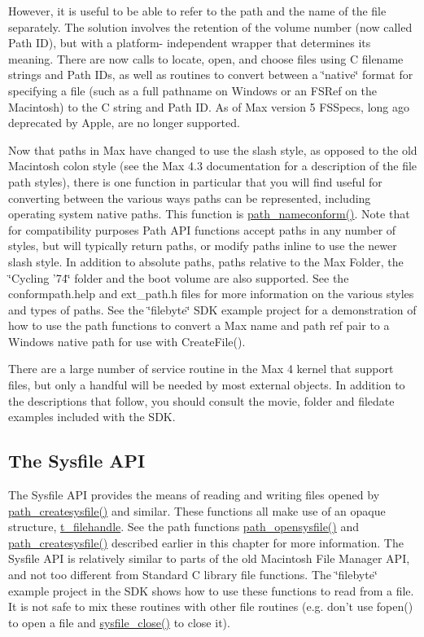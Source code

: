 However, it is useful to be able to refer to the path and the name of the file separately. The solution involves the retention of the volume number (now called Path ID), but with a platform-\/ independent wrapper that determines its meaning. There are now calls to locate, open, and choose files using C filename strings and Path IDs, as well as routines to convert between a \char`\"{}native\char`\"{} format for specifying a file (such as a full pathname on Windows or an FSRef on the Macintosh) to the C string and Path ID. As of Max version 5 FSSpecs, long ago deprecated by Apple, are no longer supported.

Now that paths in Max have changed to use the slash style, as opposed to the old Macintosh colon style (see the Max 4.3 documentation for a description of the file path styles), there is one function in particular that you will find useful for converting between the various ways paths can be represented, including operating system native paths. This function is \hyperlink{group__files_gaaf014af82bc666cd974b83441eb4c9c6}{path\_\-nameconform()}. Note that for compatibility purposes Path API functions accept paths in any number of styles, but will typically return paths, or modify paths inline to use the newer slash style. In addition to absolute paths, paths relative to the Max Folder, the \char`\"{}Cycling '74\char`\"{} folder and the boot volume are also supported. See the conformpath.help and ext\_\-path.h files for more information on the various styles and types of paths. See the \char`\"{}filebyte\char`\"{} SDK example project for a demonstration of how to use the path functions to convert a Max name and path ref pair to a Windows native path for use with CreateFile().

There are a large number of service routine in the Max 4 kernel that support files, but only a handful will be needed by most external objects. In addition to the descriptions that follow, you should consult the movie, folder and filedate examples included with the SDK.\hypertarget{group__files_sysfile_api}{}\subsection{The Sysfile API}\label{group__files_sysfile_api}
The Sysfile API provides the means of reading and writing files opened by \hyperlink{group__files_ga044310e9440119f12c57e9b985a9e1a3}{path\_\-createsysfile()} and similar. These functions all make use of an opaque structure, \hyperlink{group__files_gafcb776aa74d514754e83b30995b5a5d1}{t\_\-filehandle}. See the path functions \hyperlink{group__files_gaf244aeb070e1903461070cd7dbe04bf4}{path\_\-opensysfile()} and \hyperlink{group__files_ga044310e9440119f12c57e9b985a9e1a3}{path\_\-createsysfile()} described earlier in this chapter for more information. The Sysfile API is relatively similar to parts of the old Macintosh File Manager API, and not too different from Standard C library file functions. The \char`\"{}filebyte\char`\"{} example project in the SDK shows how to use these functions to read from a file. It is not safe to mix these routines with other file routines (e.g. don’t use fopen() to open a file and \hyperlink{group__files_gad17b977bcb191648c2856d589c45f0d4}{sysfile\_\-close()} to close it).

